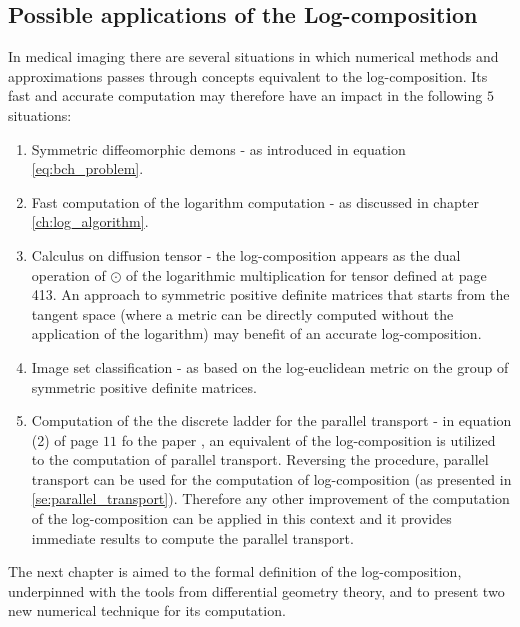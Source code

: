 \subsection{Possible applications of the Log-composition}
In medical imaging there are several situations in which numerical methods and approximations passes through concepts equivalent to the log-composition.
Its fast and accurate computation may therefore have an impact in the following $5$ situations:
\begin{enumerate}
	\item Symmetric diffeomorphic demons \cite{vercauteren08} - as introduced in equation \ref{eq:bch_problem}.
	\item Fast computation of the logarithm computation \cite{Bossa:08} - as discussed in chapter \ref{ch:log_algorithm}.
	\item Calculus on diffusion tensor \cite{Arsigny:MRM:06} - the log-composition appears as the dual operation of $\odot$ of the logarithmic multiplication for tensor defined at page 413. An approach to symmetric positive definite matrices that starts from the tangent space (where a metric can be directly computed without the application of the logarithm) may benefit of an accurate log-composition.  
	\item Image set classification \cite{huanglog} - as based on the log-euclidean metric on the group of symmetric positive definite matrices.
	\item Computation of the the discrete ladder for the parallel transport - in equation (2) of page $11$ fo the paper \cite{Lorenzi:discrete_ladders:14}, an equivalent of the log-composition is utilized to the computation of parallel transport. Reversing the procedure, parallel transport can be used for the computation of log-composition (as presented in \ref{se:parallel_transport}). Therefore any other improvement of the computation of the log-composition can be applied in this context and it provides immediate results to compute the parallel transport.
\end{enumerate}	
	
The next chapter is aimed to the formal definition of the log-composition, underpinned with the tools from differential geometry theory, and to present two new numerical technique for its computation.







